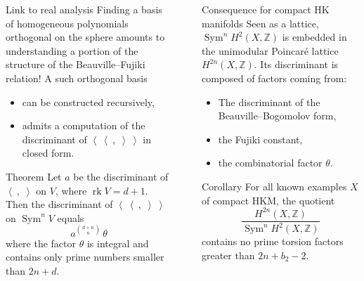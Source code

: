 \documentclass[final]{beamer}
\newlength{\sepwid}
\newlength{\onecolwid}
\DeclareMathOperator{\rank}{rk}
\DeclareMathOperator{\Sym}{Sym}
\newcommand{\bra}{\left<\!\!\!\:\left<}
\newcommand{\ket}{\right>\!\!\!\:\right>}
\newcommand{\Z}{\mathbb{Z}}
\begin{document}
\begin{frame}[t]
\begin{columns}[t]
\begin{column}{\onecolwid}
\begin{block}{Link to real analysis}
Finding a basis of homogeneous polynomials orthogonal on the sphere amounts to understanding a portion of the structure of the Beauville--Fujiki relation! A such orthogonal basis
\begin{itemize}
 \item can be constructed recursively,
 \item admits a computation of the discriminant of $\bra\ ,\;\ket$ in closed form.
\end{itemize}
\end{block}
\begin{alertblock}{Theorem}
Let $a$ be the discriminant of $\left<\ ,\;\right>$ on $V$, where $\rank V=d+1$.
Then the discriminant of $\bra\ ,\;\ket$ on $\Sym^nV $ equals
$$
a^{\binom{d+n}{n}}\, \theta
$$ 
where the factor $\theta$ is integral and contains only prime numbers smaller than $2n+d$.
\end{alertblock}


\end{column} %

\begin{column}{\sepwid}\end{column} %

\begin{column}{\onecolwid} %


\begin{block}{Consequence for compact HK manifolds}
Seen as a lattice, $\Sym^n\!H^2(X,\Z)$ is embedded in the unimodular Poincar\'e lattice $H^{2n}(X,\Z)$. Its discriminant is composed of factors coming from:
\begin{itemize}
 \item The discriminant of the Beauville--Bogomolov form,
\item the Fujiki constant,
\item the combinatorial factor $\theta$.
\end{itemize}
\vspace{-5mm}
\end{block}
\begin{alertblock}{Corollary}
For all known examples $X $ of compact HKM, the quotient
$$
\frac{H^{2n}(X,\Z)}{\Sym^n\!H^2(X,\Z)}
$$
contains no prime torsion factors greater than $2n +b_2-2$.
\end{alertblock}





\end{column}
\end{columns}
\end{frame}
\end{document}
